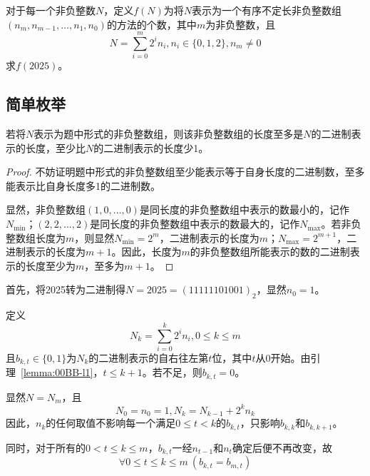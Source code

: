

对于每一个非负整数$N$，定义$f(N)$为将$N$表示为一个有序不定长非负整数组$(n_m, n_{m - 1}, \dots, n_1, n_0)$的方法的个数，其中$m$为非负整数，且
\[ N = \sum_{i = 0}^m 2^in_i, n_i \in\{0, 1, 2\}, n_m \ne0 \]
求$f(2025)$。


\subsection{简单枚举}

\begin{lemma} \label{lemma:00BB-l1}
  若将$N$表示为题中形式的非负整数组，则该非负整数组的长度至多是$N$的二进制表示的长度，至少比$N$的二进制表示的长度少1。
\end{lemma}

\begin{proof}
  不妨证明题中形式的非负整数组至少能表示等于自身长度的二进制数，至多能表示比自身长度多1的二进制数。

  显然，非负整数组$(1, 0, \dots, 0)$是同长度的非负整数组中表示的数最小的，记作$N_{\min}$；$(2, 2, \dots, 2)$是同长度的非负整数组中表示的数最大的，记作$N_{\max}$。若非负整数组长度为$m$，则显然$N_{\min} = 2^m$，二进制表示的长度为$m$；$N_{\max} = 2^{m + 1}$，二进制表示的长度为$m + 1$。因此，长度为$m$的非负整数组所能表示的数的二进制表示的长度至少为$m$，至多为$m + 1$。
\end{proof}

首先，将2025转为二进制得$N = 2025 = (11111101001)_2$，显然$n_0 = 1$。

定义
\[ N_k = \sum_{i = 0}^k 2^in_i, 0 \le k \le m \]
且$b_{k, t} \in\{0, 1\}$为$N_k$的二进制表示的自右往左第$t$位，其中$t$从0开始。由引理~\ref{lemma:00BB-l1}，$t \le k + 1$。若不足，则$b_{k, t} = 0$。

显然$N = N_m$，且
\[ N_0 = n_0 = 1, N_k = N_{k - 1} + 2^kn_k \]
因此，$n_k$的任何取值不影响每一个满足$0 \le t < k$的$b_{k, t}$，只影响$b_{k, k}$和$b_{k, k + 1}$。

同时，对于所有的$0 < t \le k \le m$，$b_{k, t}$一经$n_{t - 1}$和$n_t$确定后便不再改变，故
\begin{equation}
    \forall 0 \le t \le k \le m\ (b_{k, t} = b_{m, t}) \label{eq:00BB-rem}
\end{equation}

